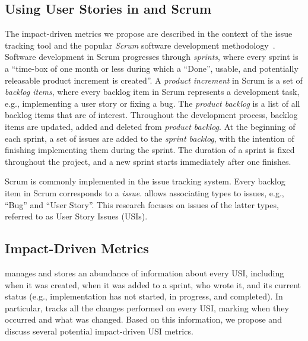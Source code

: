 \subsection{Using User Stories in \jira and Scrum}
The impact-driven metrics we propose are described in the context of the \jira issue tracking tool and the popular \emph{Scrum} software development methodology~\cite{schwaber2002agile}. 
Software development in Scrum progresses through \emph{sprints}, where every sprint is a ``time-box of one month or less during which a ``Done'', usable, and potentially releasable product increment is created''\cite{schwaber2017agile}. 
A \emph{product increment} in Scrum is a set of \emph{backlog items}, where every backlog item in Scrum represents a development task, e.g., implementing a user story or fixing a bug. 
The \emph{product backlog} is a list of all backlog items that are of interest. 
Throughout the development process, backlog items are updated, added and deleted from \emph{product backlog}. 
At the beginning of each sprint, a set of issues are added to the \emph{sprint backlog}, with the intention of finishing implementing them during the sprint. 
The duration of a sprint is fixed throughout the project, and a new sprint starts immediately after one finishes. 


Scrum is commonly implemented in the \jira issue tracking system. 
Every backlog item in Scrum corresponds to a \emph{\jira issue}. 
\jira allows associating types to issues, e.g., ``Bug'' and ``User Story''. 
This research focuses on issues of the latter types, referred to as User Story Issues (USIs). %






\subsection{Impact-Driven Metrics}
\jira manages and stores an abundance of information about every USI, including when it was created, when it was added to a sprint, who wrote it, and its current status (e.g., implementation has not started, in progress, and completed). 
In particular, \jira tracks all the changes performed on every USI, marking when they occurred and what was changed. 
Based on this information, we propose and discuss several potential impact-driven USI metrics. 


